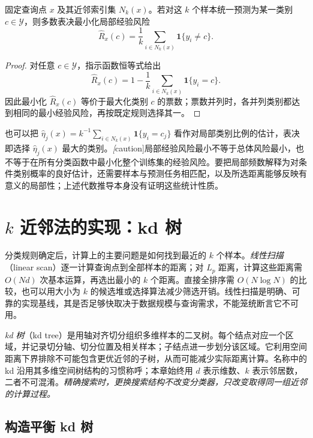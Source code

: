 \begin{proposition}
\label{prop:lihang-knn-local-erm}
固定查询点 $x$ 及其近邻索引集 $N_k(x)$。若对这 $k$ 个样本统一预测为某一类别 $c\in\mathcal Y$，则多数表决最小化局部经验风险
\begin{equation}
  \widehat R_x(c)
  =\frac1k\sum_{i\in N_k(x)}\mathbf 1\{y_i\ne c\}.
  \label{eq:lihang-knn-local-risk}
\end{equation}
\end{proposition}
\begin{proof}
对任意 $c\in\mathcal Y$，指示函数恒等式给出
\[
  \widehat R_x(c)
  =1-\frac1k\sum_{i\in N_k(x)}\mathbf 1\{y_i=c\}.
\]
因此最小化 $\widehat R_x(c)$ 等价于最大化类别 $c$ 的票数；票数并列时，各并列类别都达到相同的最小经验风险，再按既定规则选择其一。
\end{proof}

也可以把 $\widehat\eta_j(x)=k^{-1}\sum_{i\in N_k(x)}\mathbf 1\{y_i=c_j\}$ 看作对局部类别比例的估计，表决即选择 $\widehat\eta_j(x)$ 最大的类别。\emph[caution]{局部经验风险最小不等于总体风险最小，也不等于在所有分类函数中最小化整个训练集的经验风险。}要把局部频数解释为对条件类别概率的良好估计，还需要样本与预测任务相匹配，以及所选距离能够反映有意义的局部性；上述代数推导本身没有证明这些统计性质。

\section{$k$ 近邻法的实现：kd 树}
\label{sec:lihang-knn-kdtree}

分类规则确定后，计算上的主要问题是如何找到最近的 $k$ 个样本。\emph{线性扫描}（linear scan）逐一计算查询点到全部样本的距离；对 $L_p$ 距离，计算这些距离需 $O(Nd)$ 次基本运算，再选出最小的 $k$ 个距离。直接全排序需 $O(N\log N)$ 的比较，也可以用大小为 $k$ 的候选堆或选择算法减少筛选开销。线性扫描是明确、可靠的实现基线，其是否足够快取决于数据规模与查询需求，不能笼统断言它不可用。

\emph{kd 树}（kd tree）是用轴对齐切分组织多维样本的二叉树。每个结点对应一个区域，并记录切分轴、切分位置及相关样本；子结点进一步划分该区域。它利用空间距离下界排除不可能包含更优近邻的子树，从而可能减少实际距离计算。名称中的 kd 沿用其多维空间树结构的习惯称呼；本章始终用 $d$ 表示维数、$k$ 表示邻居数，二者不可混淆。\emph{精确搜索时，更换搜索结构不改变分类器，只改变取得同一组近邻的计算过程。}

\subsection{构造平衡 kd 树}
\label{subsec:lihang-knn-kdtree-build}

